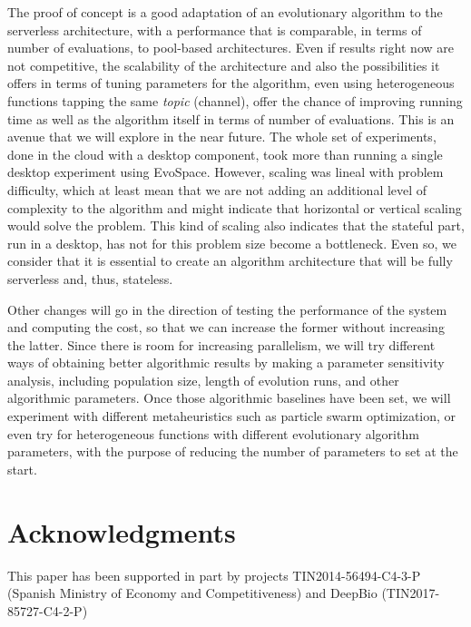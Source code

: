 \documentclass{llncs}
\begin{document}
  The proof of concept is a good adaptation of an evolutionary algorithm
  to the serverless architecture, with a performance that is comparable,
  in terms of number of evaluations, to pool-based architectures. Even
  if results right now are not competitive, the scalability of the
  architecture and also the possibilities it offers in terms of tuning
  parameters for the algorithm, even using heterogeneous functions
  tapping the same {\em topic} (channel), offer the chance of improving
  running time as well as the algorithm itself in terms of number of
  evaluations. This is an avenue that we will explore in the near
  future. The whole set of experiments, done in the cloud with a desktop
  component, took more than running a single desktop experiment using
  EvoSpace. However, scaling was lineal with problem difficulty, which
  at least mean that we are not adding an additional level of complexity
  to the algorithm and might indicate that horizontal or vertical
  scaling would solve the problem. This kind of scaling also indicates
  that the stateful part, run in a desktop, has not for this problem
  size become a bottleneck. Even so, we consider that it is essential to
  create an algorithm architecture that will be fully serverless and,
  thus, stateless.

  Other changes will go in the direction of testing the performance of
  the system and computing the cost, so that we can increase the former
  without increasing the latter. Since there is room for increasing
  parallelism, we will try different ways of obtaining better
  algorithmic results by making a parameter sensitivity analysis,
  including population size, length of evolution runs, and other
  algorithmic parameters.  Once those algorithmic baselines have been set, we will experiment
  with different metaheuristics such as particle swarm optimization, or
  even try for heterogeneous functions with different evolutionary
  algorithm parameters, with the purpose of reducing the number of
  parameters to set at the start.

\section*{Acknowledgments}

  This paper has been supported in part by
projects TIN2014-56494-C4-3-P (Spanish Ministry of Economy and
Competitiveness) and DeepBio (TIN2017-85727-C4-2-P)

  
  

  
\end{document}
